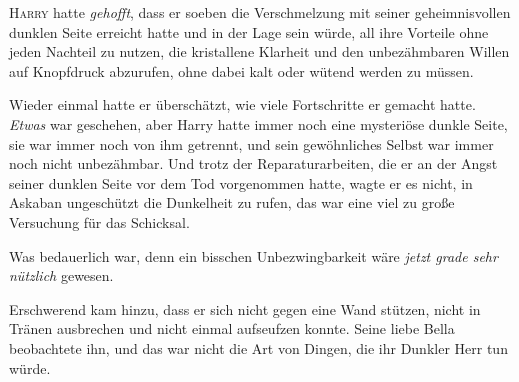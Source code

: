 
\lettrine{H}{arry} hatte \emph{gehofft}, dass er soeben die Verschmelzung mit seiner geheimnisvollen dunklen Seite erreicht hatte und in der Lage sein würde, all ihre Vorteile ohne jeden Nachteil zu nutzen, die kristallene Klarheit und den unbezähmbaren Willen auf Knopfdruck abzurufen, ohne dabei kalt oder wütend werden zu müssen.

Wieder einmal hatte er überschätzt, wie viele Fortschritte er gemacht hatte. \emph{Etwas} war geschehen, aber Harry hatte immer noch eine mysteriöse dunkle Seite, sie war immer noch von ihm getrennt, und sein gewöhnliches Selbst war immer noch nicht unbezähmbar. Und trotz der Reparaturarbeiten, die er an der Angst seiner dunklen Seite vor dem Tod vorgenommen hatte, wagte er es nicht, in Askaban ungeschützt die Dunkelheit zu rufen, das war eine viel zu große Versuchung für das Schicksal.

Was bedauerlich war, denn ein bisschen Unbezwingbarkeit wäre \emph{jetzt grade sehr nützlich} gewesen.

Erschwerend kam hinzu, dass er sich nicht gegen eine Wand stützen, nicht in Tränen ausbrechen und nicht einmal aufseufzen konnte. Seine liebe Bella beobachtete ihn, und das war nicht die Art von Dingen, die ihr Dunkler Herr tun würde.

